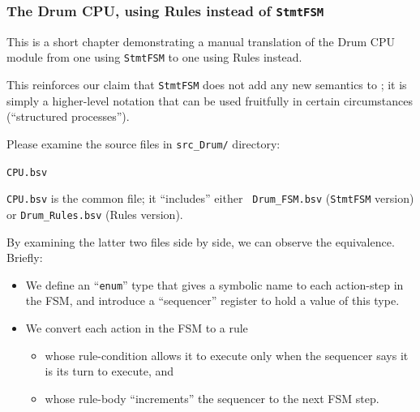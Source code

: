 
\begin{frame}[fragile]
\frametitle{The Drum CPU, using Rules instead of {\tt StmtFSM}}

\footnotesize

This is a short chapter demonstrating a manual translation of the Drum
CPU module from one using {\tt StmtFSM} to one using Rules instead.

\vxx

This reinforces our claim that {\tt StmtFSM} does not add any new
semantics to {\BSV}; it is simply a higher-level notation that can be
used fruitfully in certain circumstances (``structured processes'').

\vxx

Please examine the source files in {\tt src\_Drum/} directory:

\begin{center}
\mbox{{\tt CPU.bsv}  }
\end{center}

{\tt CPU.bsv} is the common file; it ``includes'' either {\tt
Drum\_FSM.bsv} ({\tt StmtFSM} version) or {\tt Drum\_Rules.bsv} (Rules
version).

By examining the latter two files side by side, we can observe the
equivalence.  Briefly:

\begin{itemize}

  \item We define an ``{\tt enum}'' type that gives a symbolic name to
      each action-step in the FSM, and introduce a ``sequencer''
      register to hold a value of this type.

  \item We convert each action in the FSM to a rule

      \begin{itemize}\footnotesize

        \item whose rule-condition allows it to execute only when the
            sequencer says it is its turn to execute, and

        \item whose rule-body ``increments'' the sequencer to the next FSM step.
      \end{itemize}

\end{itemize}

\end{frame}

